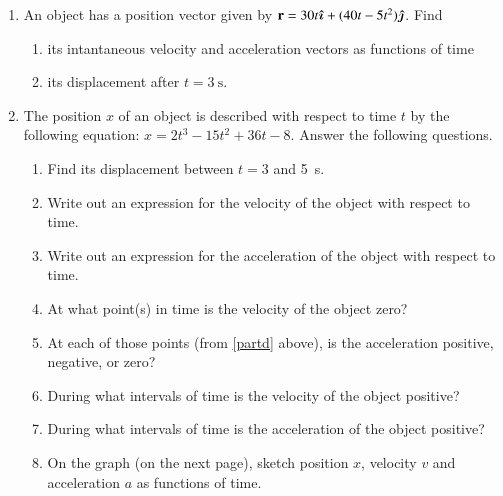 \documentclass{../../../oss-apphys}
\begin{document}
\begin{enumerate}[leftmargin=15pt]
\item An object has a position vector given by
  $\mathbf{r}=30t\bm{\hat{\imath}}+(40t-5t^2)\bm{\hat{\jmath}}$. Find
  \begin{enumerate}[noitemsep,topsep=0pt]
  \item its intantaneous velocity and acceleration vectors as functions of time
  \item its displacement after $t=\SI{3}{\s}$.
  \end{enumerate}
  \vspace{2in}

\item The position $x$ of an object is described with respect to time $t$ by
  the following equation: $x=2t^3-15t^2+36t-8$. Answer the following questions.
  \begin{enumerate}[noitemsep,topsep=0pt]
  \item Find its displacement between $t=\num{3}$ and \SI{5}{\second}.
  \item Write out an expression for the velocity of the object with respect to
    time.
  \item Write out an expression for the acceleration of the object with respect
    to time.
  \item At what point(s) in time is the velocity of the object zero?
    \label{partd}
  \item At each of those points (from \ref{partd} above), is the acceleration
    positive, negative, or zero?
  \item During what intervals of time is the velocity of the object positive?
  \item During what intervals of time is the acceleration of the object
    positive?
  \item On the graph (on the next page), sketch position $x$, velocity $v$ and
    acceleration $a$ as functions of time.
  \end{enumerate}
  \newpage
  \begin{center}


\end{center}
\end{enumerate}
\end{document}
